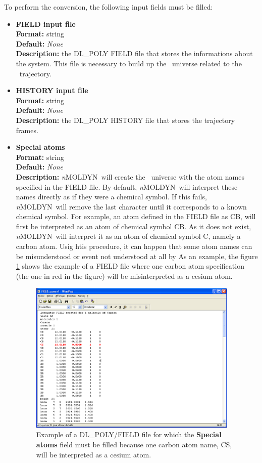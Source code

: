 \documentclass[a4paper,11pt]{report}
\newcommand{\NMOLDYN}{\textit{n}MOLDYN}
\begin{document}
To perform the conversion, the following input fields must be filled:
\begin{itemize}
\item \textbf{FIELD input file}\\
\textbf{Format:} string\\
\textbf{Default:} \textit{None}\\
\textbf{Description:} the DL\_POLY FIELD file that stores the informations about the system. This file is necessary to build up 
the \MMTK\ universe related to the \MMTK\ trajectory.

\item \textbf{HISTORY input file}\\
\textbf{Format:} string\\
\textbf{Default:} \textit{None}\\
\textbf{Description:} the DL\_POLY HISTORY file that stores the trajectory frames.

\item \textbf{Special atoms}\\
\textbf{Format:} string\\
\textbf{Default:} \textit{None}\\
\textbf{Description:} \NMOLDYN\ will create the \MMTK\ universe with the atom names specified in the FIELD file. 
By default, \NMOLDYN\ will interpret these names directly as if they were a chemical symbol. If this fails, 
\NMOLDYN\ will remove the last character until it corresponds to a known chemical symbol. For example, an 
atom defined in the FIELD file as CB, will first be interpreted as an atom of chemical symbol CB. As it does not 
exist, \NMOLDYN\ will interpret it as an atom of chemical symbol C, namely a carbon atom. Usig htis procedure, 
it can happen that some atom names can be misunderstood or event not understood at all by \MMTK\. 
As an example, the figure \ref{fig:dlpoly_field_example} shows the example of a FIELD file 
where one carbon atom specification (the one in red in the figure) will be misinterpreted as a cesium atom.
\newpage
\begin{figure}[h!]
\begin{center}
\includegraphics[width=10cm]{Figures/dlpoly_field_example.eps}
\end{center}
\caption[Example of a DL\_POLY/FIELD file]{Example of a DL\_POLY/FIELD file for which the \textbf{Special atoms} field must be 
filled because one carbon atom name, CS, will be interpreted as a cesium atom.}
\label{fig:dlpoly_field_example}
\end{figure}


\end{itemize}
\end{document}
